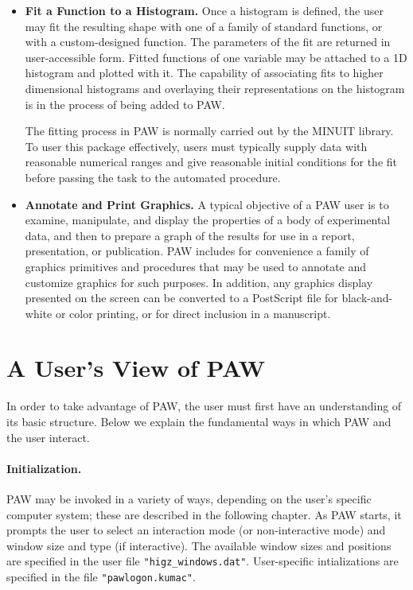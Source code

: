 \begin{itemize}
\item {\bf Fit a Function to a Histogram.}  Once a histogram is defined, the 
      user may fit the resulting shape with one of a family of standard 
      functions, or with a custom-designed function.  The parameters of the fit
      are returned in user-accessible form.  Fitted functions of one variable
      may be attached to a 1D histogram and plotted with it.  The capability of
      associating fits to higher dimensional histograms and overlaying their
      representations on the histogram is in the process of being added to PAW.
 
      The fitting process in PAW is normally carried out by the MINUIT library.
      To user this package effectively, users must typically supply data with
      reasonable numerical ranges and give reasonable initial conditions for the
      fit before passing the task to the automated procedure.
 
\item {\bf Annotate and Print Graphics.} A typical objective of a PAW user is 
      to examine, manipulate, and display the properties of a body of
      experimental data, and then to prepare a graph of the results for use in
      a report, presentation, or publication.  PAW includes for convenience a
      family of graphics primitives and procedures that may be used to annotate
      and customize graphics for such purposes.  In addition, any graphics
      display presented on the screen can be converted to a PostScript file for
      black-and-white or color printing, or for direct inclusion in a
      manuscript.
 
\end{itemize}
 
\section{A User's View of PAW}
 
In order to take advantage of PAW, the user must first have an understanding of
its basic structure.  Below we explain the fundamental ways in which PAW and the
user interact.
 
\paragraph{Initialization.}  PAW may be invoked in a variety of ways, depending
on the user's specific computer system; these are described in the following 
chapter.  As PAW starts, it prompts the user to select an interaction mode (or 
non-interactive mode) and window size and type (if interactive).  The available
window sizes and positions are specified in the user file 
\texttt{"higz_windows.dat"}. User-specific intializations are specified in the 
file \texttt{"pawlogon.kumac"}.
 
